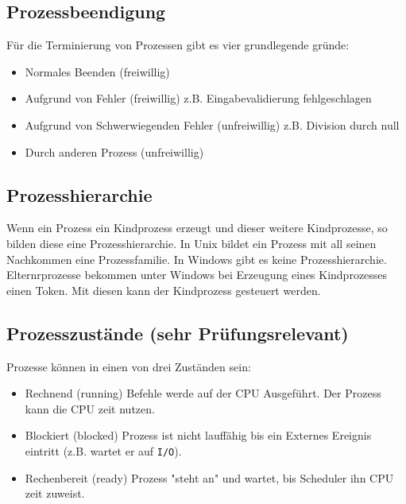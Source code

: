 \subsection{Prozessbeendigung}

Für die Terminierung von Prozessen gibt es vier grundlegende gründe:

\begin{itemize}
    \item Normales Beenden (freiwillig)
    \item Aufgrund von Fehler (freiwillig) \newline z.B. Eingabevalidierung fehl\-ge\-schlagen
    \item Aufgrund von Schwerwiegenden Fehler (unfreiwillig) \newline z.B. Di\-vi\-sion durch null
    \item Durch anderen Prozess (unfreiwillig)
\end{itemize}

\subsection{Prozesshierarchie}

Wenn ein Prozess ein Kindprozess erzeugt und dieser weitere Kindprozesse, so bilden diese eine Prozesshierarchie. In Unix bildet ein Prozess mit all seinen Nachkommen eine Prozessfamilie. In Windows gibt es keine Prozesshierarchie. Elternrprozesse bekommen unter Windows bei Erzeugung eines Kindprozesses einen Token. Mit diesen kann der Kindprozess gesteuert werden.

\subsection{Prozesszustände (sehr Prüfungsrelevant)}

Prozesse können in einen von drei Zuständen sein:

\begin{itemize}
    \item Rechnend (running) Befehle werde auf der CPU Ausgeführt. Der Pro\-zess kann die CPU zeit nutzen.
    \item Blockiert (blocked) Prozess ist nicht lauffähig bis ein Externes Ereignis eintritt (z.B. wartet er auf \texttt{I/O}).
    \item Rechenbereit (ready) Prozess "steht an" und wartet, bis Scheduler ihn CPU zeit zuweist.
\end{itemize}

